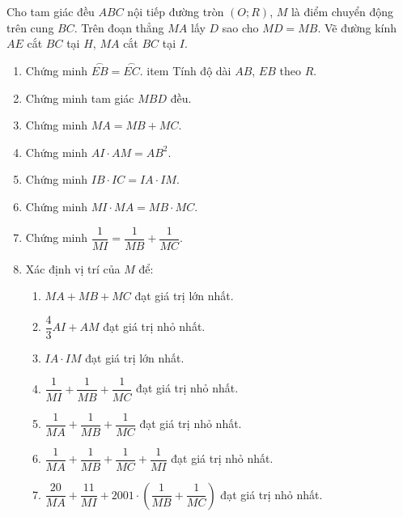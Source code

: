 \begin{bt}%
	Cho tam giác đều $ABC$ nội tiếp đường tròn $(O;R)$, $M$ là điểm chuyển động trên cung $BC$. Trên đoạn thẳng $MA$ lấy $D$ sao cho $MD=MB$. Vẽ đường kính $AE$ cắt $BC$ tại $H$, $MA$ cắt $BC$ tại $I$.
	\begin{enumerate}
		\item Chứng minh $\stackrel\frown{EB}=\stackrel\frown{EC}$.
		item Tính độ dài $AB$, $EB$ theo $R$.
		\item Chứng minh tam giác $MBD$ đều.
		\item Chứng minh $MA=MB+MC$.
		\item Chứng minh $AI\cdot AM=AB^2$.
		\item Chứng minh $IB\cdot IC=IA\cdot IM$.
		\item Chứng minh $MI\cdot MA=MB\cdot MC$.
		\item Chứng minh $\dfrac{1}{MI}=\dfrac{1}{MB}+\dfrac{1}{MC}$.
		\item Xác định vị trí của $M$ để:
		\begin{enumerate}[1.]
			\item $MA+MB+MC$ đạt giá trị lớn nhất.
			\item $\dfrac{4}{3}AI+AM$ đạt giá trị nhỏ nhất.
			\item $IA\cdot IM$ đạt giá trị lớn nhất.
			\item $\dfrac{1}{MI}+\dfrac{1}{MB}+\dfrac{1}{MC}$ đạt giá trị nhỏ nhất.
			\item $\dfrac{1}{MA}+\dfrac{1}{MB}+\dfrac{1}{MC}$ đạt giá trị nhỏ nhất.
			\item $\dfrac{1}{MA}+\dfrac{1}{MB}+\dfrac{1}{MC}+\dfrac{1}{MI}$ đạt giá trị nhỏ nhất.
			\item $\dfrac{20}{MA}+\dfrac{11}{MI}+2001\cdot\left( \dfrac{1}{MB}+\dfrac{1}{MC}\right) $ đạt giá trị nhỏ nhất.
		\end{enumerate}
	\end{enumerate}
\end{bt}
